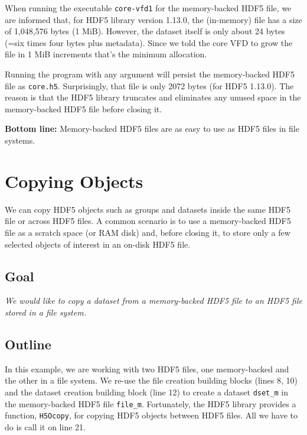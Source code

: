 \documentclass[a4paper, 12pt]{article}
\begin{document}
When running the executable \texttt{core-vfd1} for the memory-backed HDF5 file, we
are informed that, for HDF5 library version 1.13.0, the (in-memory) file has
a size of 1,048,576 bytes (1 MiB). However, the dataset itself is only about
24 bytes (=six times four bytes plus metadata). Since we told the core VFD
to grow the file in 1 MiB increments that's the minimum allocation.

Running the program with any argument will persist the memory-backed HDF5
file as \texttt{core.h5}. Surprisingly, that file is only 2072 bytes (for HDF5
1.13.0). The reason is that the HDF5 library truncates and eliminates any
unused space in the memory-backed HDF5 file before closing it.

\textbf{\textbf{Bottom line:}} Memory-backed HDF5 files are as easy to use as HDF5 files
in file systems.

\section{Copying Objects \label{org0178d17}}
\label{sec:orgecd53b6}

We can copy HDF5 objects such as groups and datasets inside the same HDF5 file
or across HDF5 files. A common scenario is to use a memory-backed HDF5 file as
a scratch space (or RAM disk) and, before closing it, to store only a few
selected objects of interest in an on-disk HDF5 file.

\subsection{Goal}
\label{sec:org99895c2}

\emph{We would like to copy a dataset from a memory-backed HDF5 file to an HDF5 file
stored in a file system.}

\subsection{Outline}
\label{sec:orgc9ba792}

In this example, we are working with two HDF5 files, one memory-backed and the
other in a file system. We re-use the file creation building blocks (lines
8, 10) and the dataset creation building block (line
12) to create a dataset \texttt{dset\_m} in the memory-backed HDF5 file
\texttt{file\_m}. Fortunately, the HDF5 library provides a function, \texttt{H5Ocopy}, for
copying HDF5 objects between HDF5 files. All we have to do is call it on line
21.
\end{document}
